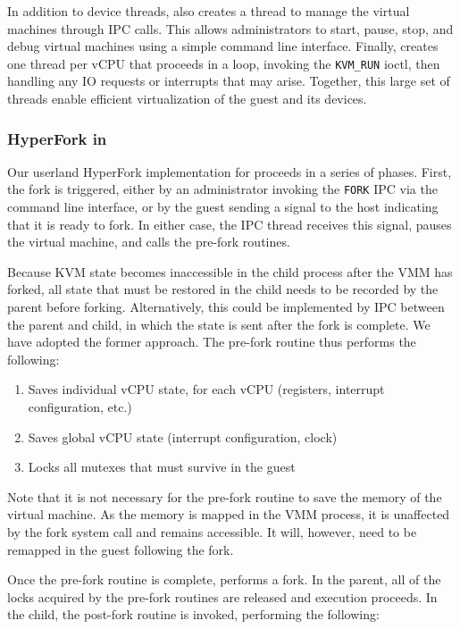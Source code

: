 In addition to device threads, \kvmtool{} also creates a thread to manage the
virtual machines through IPC calls. This allows administrators to start, pause,
stop, and debug virtual machines using a simple command line interface. Finally,
\kvmtool{} creates one thread per vCPU that proceeds in a loop, invoking the
\texttt{KVM\_RUN} ioctl, then handling any IO requests or interrupts that may
arise. Together, this large set of threads enable efficient virtualization of
the guest and its devices.

\subsubsection{HyperFork in \kvmtool{}}

Our userland HyperFork implementation for \kvmtool{} proceeds in a series of
phases. First, the fork is triggered, either by an administrator invoking the
\texttt{FORK} IPC via the command line interface, or by the guest sending a
signal to the host indicating that it is ready to fork. In either case, the IPC
thread receives this signal, pauses the virtual machine, and calls the pre-fork
routines.

Because KVM state becomes inaccessible in the child process after the VMM has
forked, all state that must be restored in the child needs to be recorded by the
parent before forking. Alternatively, this could be implemented by IPC between
the parent and child, in which the state is sent after the fork is complete. We
have adopted the former approach. The pre-fork routine thus performs the
following:

\begin{enumerate}
\item Saves individual vCPU state, for each vCPU (registers, interrupt configuration, etc.)
\item Saves global vCPU state (interrupt configuration, clock)
\item Locks all mutexes that must survive in the guest
\end{enumerate}

Note that it is not necessary for the pre-fork routine to save the memory of the
virtual machine. As the memory is mapped in the VMM process, it is unaffected by
the fork system call and remains accessible. It will, however, need to be
remapped in the guest following the fork.

Once the pre-fork routine is complete, \kvmtool{} performs a fork. In the
parent, all of the locks acquired by the pre-fork routines are released and
execution proceeds. In the child, the post-fork routine is invoked, performing
the following:

